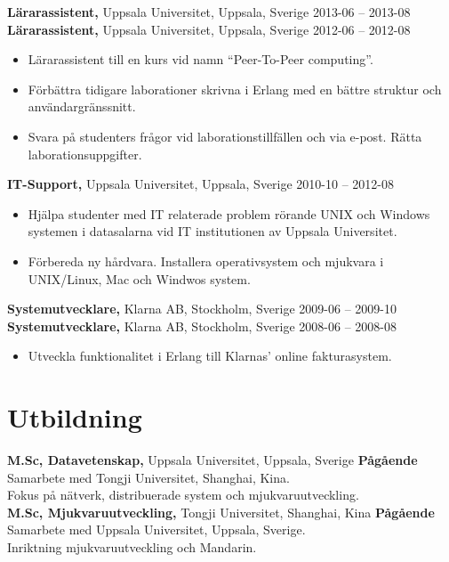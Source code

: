 \documentclass[margin]{res}
\begin{document}
\begin{resume}
{\bf Lärarassistent,} Uppsala Universitet, Uppsala, Sverige \hfill 2013-06 -- 2013-08\\
{\bf Lärarassistent,} Uppsala Universitet, Uppsala, Sverige \hfill 2012-06 -- 2012-08
 \begin{itemize} \itemsep -2pt  %
 \item Lärarassistent till en kurs vid namn ``Peer-To-Peer computing''.
 \item Förbättra tidigare laborationer skrivna i Erlang med en bättre struktur och användargränssnitt.
 \item Svara på studenters frågor vid laborationstillfällen och via e-post. Rätta laborationsuppgifter.
 \end{itemize}

{\bf IT-Support,} Uppsala Universitet, Uppsala, Sverige \hfill 2010-10 -- 2012-08
 \begin{itemize} \itemsep -2pt  %
 \item Hjälpa studenter med IT relaterade problem rörande UNIX och
   Windows systemen i datasalarna vid IT institutionen av Uppsala Universitet.
 \item Förbereda ny hårdvara. Installera operativsystem och mjukvara i UNIX/Linux, Mac och Windwos system.
 \end{itemize}

{\bf Systemutvecklare,} Klarna AB, Stockholm, Sverige \hfill 2009-06 -- 2009-10\\
{\bf Systemutvecklare,} Klarna AB, Stockholm, Sverige \hfill 2008-06 -- 2008-08
 \begin{itemize} \itemsep -2pt  %
 \item Utveckla funktionalitet i Erlang till Klarnas' online fakturasystem.
 \end{itemize}

\section{Utbildning}
{\bf M.Sc,  Datavetenskap,} Uppsala Universitet, Uppsala, Sverige \hfill \textbf{Pågående} \\
Samarbete med Tongji Universitet, Shanghai, Kina. \\
Fokus på nätverk, distribuerade system och mjukvaruutveckling. \\

{\bf M.Sc, Mjukvaruutveckling,} Tongji Universitet, Shanghai, Kina \hfill \textbf{Pågående} \\
Samarbete med Uppsala Universitet, Uppsala, Sverige. \\
Inriktning mjukvaruutveckling och Mandarin.


\end{resume}
\end{document}
